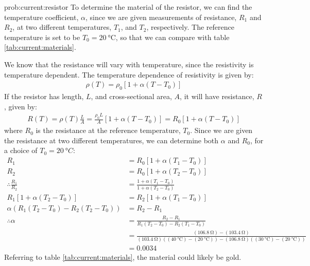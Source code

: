 \begin{solution}{prob:current:resistor}\label{soln:current:resistor}
To determine the material of the resistor, we can find the temperature coefficient, $\alpha$, since we are given measurements of resistance, $R_1$ and $R_2$, at two different temperatures, $T_1$, and $T_2$, respectively. The reference temperature is set to be $T_0=\SI{20}{\degreeCelsius}$, so that we can compare with table \ref{tab:current:materials}.

We know that the resistance will vary with temperature, since the resistivity is temperature dependent. The temperature dependence of resistivity is given by:
\begin{align*}
\rho(T)=\rho_0[1+\alpha(T-T_0)]
\end{align*}
If the resistor has length, $L$, and cross-sectional area, $A$, it will have resistance, $R$, given by:
\begin{align*}
R(T)=\rho(T) \frac{L}{A}=\frac{\rho_0 L}{A}[1+\alpha(T-T_0)]=R_0[1+\alpha(T-T_0)]
\end{align*}
where $R_0$ is the resistance at the reference temperature, $T_0$. Since we are given the resistance at two different temperatures, we can determine both $\alpha$ and $R_0$, for a choice of $T_0=\SI{20}{\degree C}$:
\begin{align*}
R_1&=R_0[1+\alpha(T_1-T_0)]\\
R_2&=R_0[1+\alpha(T_2-T_0)]\\
\therefore\frac{R_1}{R_2}&=\frac{1+\alpha(T_1-T_0)}{1+\alpha(T_2-T_0)}\\
R_1 [1+\alpha(T_2-T_0)]&=R_2 [1+\alpha(T_1-T_0)]\\
\alpha \left( R_1(T_2-T_0) - R_2(T_2-T_0) \right)&=R_2-R_1\\
\therefore \alpha &= \frac{R_2-R_1}{R_1(T_2-T_0) - R_2(T_1-T_0) }\\
&=\frac{(\SI{106.8}{\ohm}) - (\SI{103.4}{\ohm})}{(\SI{103.4}{\ohm})((\SI{40}{\degreeCelsius})-(\SI{20}{\degreeCelsius})) - (\SI{106.8}{\ohm})((\SI{30}{\degreeCelsius})-(\SI{20}{\degreeCelsius})) }\\
&=0.0034
\end{align*}
Referring to table \ref{tab:current:materials}, the material could likely be gold.

\end{solution}


